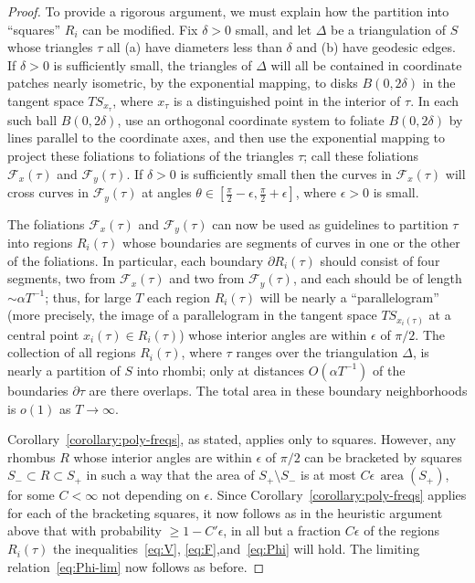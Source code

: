 \documentclass[AHL, Unicode, longabstracts, published]{cedram}
\DeclareMathOperator{\area}{area}
\begin{document}
\begin{proof}
To provide a rigorous argument, we must explain how the partition into ``squares'' $R_{i}$ can be modified. Fix $\delta >0$ small, and let $\Delta$ be a triangulation of $S$ whose triangles $\tau$ all (a) have diameters less than $\delta$ and (b) have geodesic edges. If $\delta>0$ is sufficiently small, the triangles of $\Delta$ will all be contained in coordinate patches nearly isometric, by the exponential mapping, to disks $B (0,2\delta)$ in the tangent space $TS_{x_{\tau}}$, where $x_{\tau}$ is a distinguished point in the interior of $\tau$. In each such ball $B (0,2\delta)$, use an orthogonal coordinate system to foliate $B (0,2\delta)$ by lines parallel to the coordinate axes, and then use the exponential mapping to project these foliations to foliations of the triangles $\tau$; call these foliations $\mathcal{F}_{x} (\tau)$ and $\mathcal{F}_{y} (\tau)$. If $\delta >0$ is sufficiently small then the curves in $\mathcal{F}_{x} (\tau)$ will cross curves in $\mathcal{F}_{y} (\tau)$ at angles $\theta \in[\frac{\pi}{2}-\epsilon,\frac{\pi}{2}+\epsilon]$, where $\epsilon >0$ is small.

The foliations $\mathcal{F}_{x} (\tau)$ and $\mathcal{F}_{y} (\tau)$ can now be used as guidelines to partition $\tau$ into regions $R_{i}(\tau)$ whose boundaries are segments of curves in one or the other of the foliations. In particular, each boundary $\partial R_{i} (\tau)$ should consist of four segments, two from $\mathcal{F}_{x} (\tau)$ and two from $\mathcal{F}_{y} (\tau)$, and each should be of length $\sim
\alpha T^{-1}$; thus, for large $T$ each region $R_{i} (\tau)$ will be nearly a ``parallelogram'' (more precisely, the image of a parallelogram in the tangent space $TS_{x_{i} (\tau)}$ at a central point $x_{i} (\tau)\in R_{i} (\tau)$) whose interior angles are within $\epsilon$ of $\pi /2$. The collection of all regions $R_{i} (\tau)$, where $\tau$ ranges over the triangulation $\Delta$, is nearly a partition of $S$ into rhombi; only at distances $O (\alpha T^{-1})$ of the boundaries $\partial \tau$ are there overlaps. The total area in these boundary neighborhoods is $o (1)$ as $T \rightarrow \infty$.

Corollary~\ref{corollary:poly-freqs}, as stated, applies only to squares. However, any rhombus $R$ whose interior angles are within $\epsilon$ of $\pi /2$ can be bracketed by squares $S_{-}\subset R\subset S_{+}$ in such a way that the area of $S_{+}\setminus S_{-}$ is at most $C\epsilon \,\area (S_{+})$, for some $C<\infty$ not depending on $\epsilon$. Since Corollary~\ref{corollary:poly-freqs} applies for each of the bracketing squares, it now follows as in the heuristic argument above that with probability $\geq 1-C'\epsilon$, in all but a fraction $C\epsilon$ of the regions $R_{i} (\tau)$ the inequalities~\eqref{eq:V}, \eqref{eq:F},and~\eqref{eq:Phi} will hold. The limiting relation~\eqref{eq:Phi-lim} now follows as before.
\end{proof}
\end{document}
